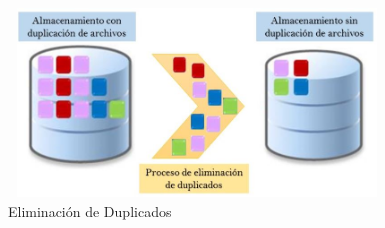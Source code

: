 
\begin{figure}[H]
\centering
	\includegraphics[width=10cm, height=5cm]{./images/Deduplicacion.jpg}
	\caption{Eliminación de Duplicados}
	\label{fig:1-3-1}
\end{figure}


